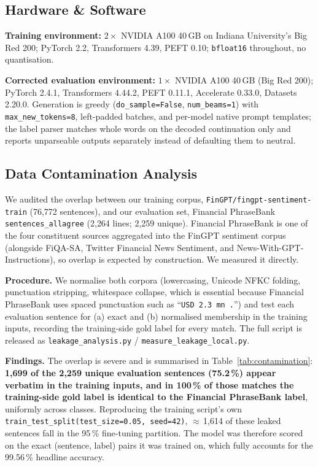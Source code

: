 \documentclass[a4paper]{article}
\begin{document}
\subsection{Hardware \& Software}

\textbf{Training environment:} $2 \times$ NVIDIA A100 40\,GB on Indiana University's Big Red 200; PyTorch 2.2, Transformers 4.39, PEFT 0.10; \texttt{bfloat16} throughout, no quantisation.

\textbf{Corrected evaluation environment:} $1 \times$ NVIDIA A100 40\,GB (Big Red 200); PyTorch 2.4.1, Transformers 4.44.2, PEFT 0.11.1, Accelerate 0.33.0, Datasets 2.20.0. Generation is greedy (\texttt{do\_sample=False}, \texttt{num\_beams=1}) with \texttt{max\_new\_tokens=8}, left-padded batches, and per-model native prompt templates; the label parser matches whole words on the decoded continuation only and reports unparseable outputs separately instead of defaulting them to neutral.

\subsection{Data Contamination Analysis}
\label{sec:contamination}

We audited the overlap between our training corpus, \texttt{FinGPT/fingpt-sentiment-train} (76{,}772 sentences), and our evaluation set, Financial PhraseBank \texttt{sentences\_allagree} (2{,}264 lines; 2{,}259 unique). Financial PhraseBank is one of the four constituent sources aggregated into the FinGPT sentiment corpus (alongside FiQA-SA, Twitter Financial News Sentiment, and News-With-GPT-Instructions), so overlap is expected by construction. We measured it directly.

\textbf{Procedure.} We normalise both corpora (lowercasing, Unicode NFKC folding, punctuation stripping, whitespace collapse, which is essential because Financial PhraseBank uses spaced punctuation such as ``\texttt{USD 2.3 mn .}'') and test each evaluation sentence for (a) exact and (b) normalised membership in the training inputs, recording the training-side gold label for every match. The full script is released as \texttt{leakage\_analysis.py} / \texttt{measure\_leakage\_local.py}.

\textbf{Findings.} The overlap is severe and is summarised in Table~\ref{tab:contamination}: \textbf{1{,}699 of the 2{,}259 unique evaluation sentences (75.2\,\%) appear verbatim in the training inputs, and in 100\,\% of those matches the training-side gold label is identical to the Financial PhraseBank label}, uniformly across classes. Reproducing the training script's own \texttt{train\_test\_split(test\_size=0.05, seed=42)}, $\approx$\,1{,}614 of these leaked sentences fall in the 95\,\% fine-tuning partition. The model was therefore scored on the exact (sentence, label) pairs it was trained on, which fully accounts for the 99.56\,\% headline accuracy.
\end{document}
